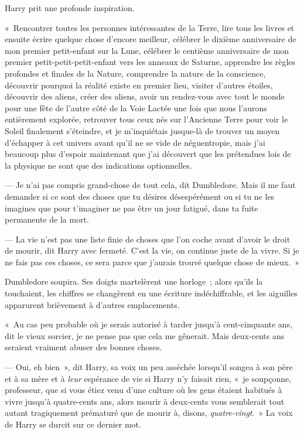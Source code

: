 Harry prit une profonde inspiration.

«~Rencontrer toutes les personnes intéressantes de la Terre, lire tous les livres et ensuite écrire quelque chose d'encore meilleur, célébrer le dixième anniversaire de mon premier petit-enfant sur la Lune, célébrer le centième anniversaire de mon premier petit-petit-petit-enfant vers les anneaux de Saturne, apprendre les règles profondes et finales de la Nature, comprendre la nature de la conscience, découvrir pourquoi la réalité existe en premier lieu, visiter d'autres étoiles, découvrir des aliens, créer des aliens, avoir un rendez-vous avec tout le monde pour une fête de l'autre côté de la Voie Lactée une fois que nous l'aurons entièrement explorée, retrouver tous ceux nés sur l'Ancienne Terre pour voir le Soleil finalement s'éteindre, et je m'inquiétais jusque-là de trouver un moyen d'échapper à cet univers avant qu'il ne se vide de néguentropie, mais j'ai beaucoup plus d'espoir maintenant que j'ai découvert que les prétendues lois de la physique ne sont que des indications optionnelles.

--- Je n'ai pas compris grand-chose de tout cela, dit Dumbledore. Mais il me faut demander si ce sont des choses que tu désires désespérément ou si tu ne les imagines que pour t'imaginer ne pas être un jour fatigué, dans ta fuite permanente de la mort.

--- La vie n'est pas une liste finie de choses que l'on coche avant d'avoir le droit de mourir, dit Harry avec fermeté. C'est la vie, on continue juste de la vivre. Si je ne fais pas ces choses, ce sera parce que j'aurais trouvé quelque chose de mieux.~»

Dumbledore soupira. Ses doigts martelèrent une horloge~; alors qu'ils la touchaient, les chiffres se changèrent en une écriture indéchiffrable, et les aiguilles apparurent brièvement à d'autres emplacements.

«~Au cas peu probable où je serais autorisé à tarder jusqu'à cent-cinquante ans, dit le vieux sorcier, je ne pense pas que cela me gênerait. Mais deux-cents ans seraient vraiment abuser des bonnes choses.

--- Oui, eh bien~», dit Harry, sa voix un peu asséchée lorsqu'il songea à son père et à sa mère et à \emph{leur} espérance de vie si Harry n'y faisait rien, «~je soupçonne, professeur, que si vous étiez venu d'une culture où les gens étaient habitués à vivre jusqu'à quatre-cents ans, alors mourir à deux-cents vous semblerait tout autant tragiquement prématuré que de mourir à, disons, \emph{quatre-vingt}.~» La voix de Harry se durcit sur ce dernier mot.

